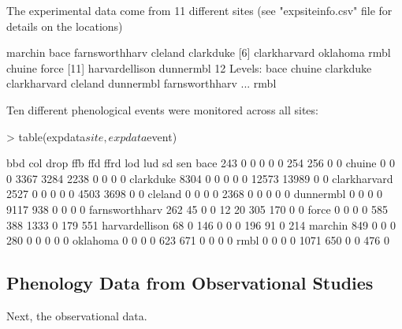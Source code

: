 \documentclass{article}
\begin{document}
The experimental data come from 11 different sites (see "expsiteinfo.csv" file for details on the locations)

\begin{Schunk}
\begin{Soutput}
 [1] marchin        bace           farnsworthharv cleland        clarkduke     
 [6] clarkharvard   oklahoma       rmbl           chuine         force         
[11] harvardellison dunnermbl     
12 Levels: bace chuine clarkduke clarkharvard cleland dunnermbl farnsworthharv ... rmbl
\end{Soutput}
\end{Schunk}

Ten different phenological events were monitored across all sites:
\begin{Schunk}
\begin{Sinput}
> table(expdata$site, expdata$event)
\end{Sinput}
\begin{Soutput}
                   bbd   col  drop   ffb   ffd  ffrd   lod   lud    sd   sen
  bace             243     0     0     0     0     0   254   256     0     0
  chuine             0     0     0  3367  3284  2238     0     0     0     0
  clarkduke       8304     0     0     0     0     0 12573 13989     0     0
  clarkharvard    2527     0     0     0     0     0  4503  3698     0     0
  cleland            0     0     0     0  2368     0     0     0     0     0
  dunnermbl          0     0     0     0  9117   938     0     0     0     0
  farnsworthharv   262    45     0     0    12    20   305   170     0     0
  force              0     0     0     0   585   388  1333     0   179   551
  harvardellison    68     0   146     0     0     0   196    91     0   214
  marchin          849     0     0     0   280     0     0     0     0     0
  oklahoma           0     0     0     0   623   671     0     0     0     0
  rmbl               0     0     0     0  1071   650     0     0   476     0
\end{Soutput}
\end{Schunk}

\subsection{Phenology Data from Observational Studies}

Next, the observational data. 
\end{document}
